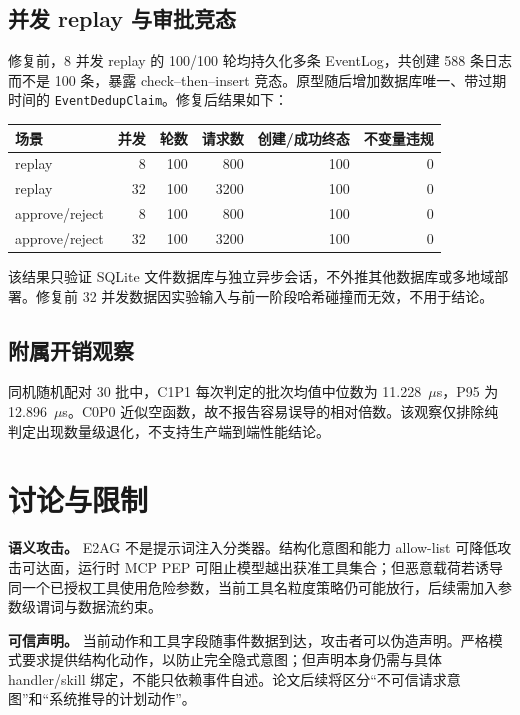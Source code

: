 \subsection{并发 replay 与审批竞态}

修复前，8 并发 replay 的 100/100 轮均持久化多条 EventLog，共创建 588 条日志而不是 100 条，暴露 check--then--insert 竞态。原型随后增加数据库唯一、带过期时间的 \texttt{EventDedupClaim}。修复后结果如下：

{
\begin{longtable}[]{@{}lrrrrr@{}}
\toprule\noalign{}
场景 & 并发 & 轮数 & 请求数 & 创建/成功终态 & 不变量违规 \\
\midrule\noalign{}
\endhead
\bottomrule\noalign{}
\endlastfoot
replay & 8 & 100 & 800 & 100 & 0 \\
replay & 32 & 100 & 3200 & 100 & 0 \\
approve/reject & 8 & 100 & 800 & 100 & 0 \\
approve/reject & 32 & 100 & 3200 & 100 & 0 \\
\end{longtable}
}

该结果只验证 SQLite 文件数据库与独立异步会话，不外推其他数据库或多地域部署。修复前 32 并发数据因实验输入与前一阶段哈希碰撞而无效，不用于结论。

\subsection{附属开销观察}

同机随机配对 30 批中，C1P1 每次判定的批次均值中位数为 11.228~$\mu$s，P95 为 12.896~$\mu$s。C0P0 近似空函数，故不报告容易误导的相对倍数。该观察仅排除纯判定出现数量级退化，不支持生产端到端性能结论。

\section{讨论与限制}\label{sec:limitations}

\textbf{语义攻击。} E2AG 不是提示词注入分类器。结构化意图和能力 allow-list 可降低攻击可达面，运行时 MCP PEP 可阻止模型越出获准工具集合；但恶意载荷若诱导同一个已授权工具使用危险参数，当前工具名粒度策略仍可能放行，后续需加入参数级谓词与数据流约束。

\textbf{可信声明。} 当前动作和工具字段随事件数据到达，攻击者可以伪造声明。严格模式要求提供结构化动作，以防止完全隐式意图；但声明本身仍需与具体 handler/skill 绑定，不能只依赖事件自述。论文后续将区分``不可信请求意图''和``系统推导的计划动作''。

